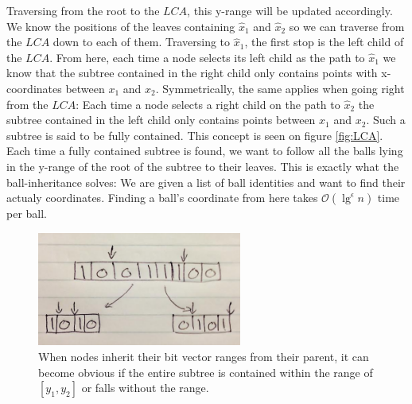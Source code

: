 Traversing from the root to the $LCA$, this y-range will be updated accordingly. We know the positions of the leaves containing $\hat{x}_1$ and $\hat{x}_2$ so we can traverse from the $LCA$ down to each of them. Traversing to $\hat{x}_1$, the first stop is the left child of the $LCA$. From here, each time a node selects its left child as the path to $\hat{x}_1$ we know that the subtree contained in the right child only contains points with x-coordinates between $x_1$ and $x_2$. Symmetrically, the same applies when going right from the $LCA$: Each time a node selects a right child on the path to $\hat{x}_2$ the subtree contained in the left child only contains points between $x_1$ and $x_2$. Such a subtree is said to be fully contained. This concept is seen on figure \ref{fig:LCA}. \\

Each time a fully contained subtree is found, we want to follow all the balls lying in the y-range of the root of the subtree to their leaves. This is exactly what the ball-inheritance solves: We are given a list of ball identities and want to find their actualy coordinates. Finding a ball's coordinate from here takes $\mathcal{O}(\lg^\epsilon n)$ time per ball.

\begin{figure}[H]
    \centering
    \includegraphics[width=0.6\textwidth]{pictures/bit_vector_split.png}
    \caption{When nodes inherit their bit vector ranges from their parent, it can become obvious if the entire subtree is contained within the range of $[y_1, y_2]$ or falls without the range.}
    \label{fig:bitvectorsplit}
\end{figure}



